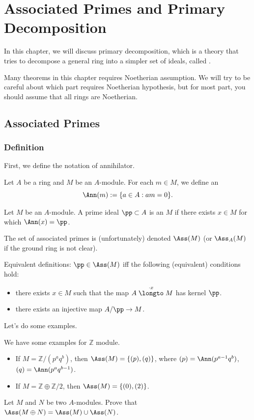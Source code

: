 \chapter{Associated Primes and Primary Decomposition}
In this chapter, we will discuss primary decomposition,
which is a theory that tries to decompose a general ring
into a simpler set of ideals, called .

Many theorems in this chapter requires Noetherian assumption.
We will try to be careful about which part requires
Noetherian hypothesis, but for most part,
you should assume that all rings are Noetherian.

\section{Associated Primes}
\subsection{Definition}
First, we define the notation of annihilator.
\begin{definition}[Annihilator]
\label{def:annihilator}
Let $A$ be a ring and $M$ be an $A$-module.
For each $m\in M$, we define an 
$$\Ann(m) := \{a\in A : am=0\}.$$
\end{definition}
\begin{definition}
    Let $M$ be an $A$-module.
    A prime ideal $\pp\subset A$ is an  $M$
    if there exists $x\in M$ for which
    $\Ann(x) = \pp$.

    The set of associated primes is (unfortunately) denoted $\Ass(M)$
    (or $\Ass_A(M)$ if the ground ring is not clear).
\end{definition}
Equivalent definitions: $\pp\in\Ass(M)$ iff
the following (equivalent) conditions hold:
\begin{itemize}
    \item there exists $x\in M$ such that the map 
    $A\stackrel{\cdot x}\longto M$ has kernel $\pp$.
    \item there exists an injective map $A/\pp\to M$.
\end{itemize}

Let's do some examples.
\begin{example}
    We have some examples for $\mathbb Z$ module.
    \begin{itemize}
    \item If $M=\mathbb Z/(p^aq^b)$, then
	$\Ass(M) = \{(p), (q)\}$,
	where $(p) = \Ann(p^{a-1}q^b)$, $(q) = \Ann(p^aq^{b-1})$.
    \item If $M=\mathbb Z\oplus\mathbb Z/2$,
	then $\Ass(M) = \{(0), (2)\}$.
    \end{itemize}
\end{example}
\begin{exercise}
Let $M$ and $N$ be two $A$-modules.
Prove that $\Ass(M\oplus N) = \Ass(M)\cup \Ass(N)$.
\end{exercise}
%
%
%
%
